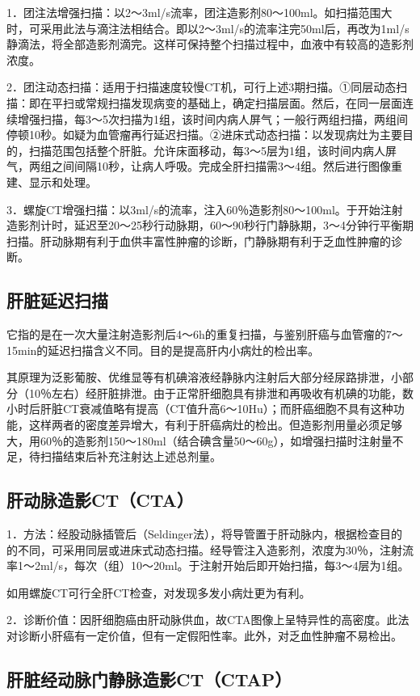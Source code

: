 1．团注法增强扫描：以2～3ml/s流率，团注造影剂80～100ml。如扫描范围大时，可采用此法与滴注法相结合。即以2～3ml/s的流率注完50ml后，再改为1ml/s静滴法，将全部造影剂滴完。这样可保持整个扫描过程中，血液中有较高的造影剂浓度。

2．团注动态扫描：适用于扫描速度较慢CT机，可行上述3期扫描。①同层动态扫描：即在平扫或常规扫描发现病变的基础上，确定扫描层面。然后，在同一层面连续增强扫描，每3～5次扫描为1组，该时间内病人屏气；一般行两组扫描，两组间停顿10秒。如疑为血管瘤再行延迟扫描。②进床式动态扫描：以发现病灶为主要目的，扫描范围包括整个肝脏。允许床面移动，每3～5层为1组，该时间内病人屏气，两组之间间隔10秒，让病人呼吸。完成全肝扫描需3～4组。然后进行图像重建、显示和处理。

3．螺旋CT增强扫描：以3ml/s的流率，注入60％造影剂80～100ml。于开始注射造影剂计时，延迟至20～25秒行动脉期，60～90秒行门静脉期，3～4分钟行平衡期扫描。肝动脉期有利于血供丰富性肿瘤的诊断，门静脉期有利于乏血性肿瘤的诊断。

\subsection{肝脏延迟扫描}

它指的是在一次大量注射造影剂后4～6h的重复扫描，与鉴别肝癌与血管瘤的7～15min的延迟扫描含义不同。目的是提高肝内小病灶的检出率。

其原理为泛影葡胺、优维显等有机碘溶液经静脉内注射后大部分经尿路排泄，小部分（10％左右）经肝脏排泄。由于正常肝细胞具有排泄和再吸收有机碘的功能，数小时后肝脏CT衰减值略有提高（CT值升高6～10Hu）；而肝癌细胞不具有这种功能，这样两者的密度差异增大，有利于肝癌病灶的检出。但造影剂用量必须足够大，用60％的造影剂150～180ml（结合碘含量50～60g），如增强扫描时注射量不足，待扫描结束后补充注射达上述总剂量。

\subsection{肝动脉造影CT（CTA）}

1．方法：经股动脉插管后（Seldinger法），将导管置于肝动脉内，根据检查目的的不同，可采用同层或进床式动态扫描。经导管注入造影剂，浓度为30％，注射流率1～2ml/s，每次（组）10～20ml。于注射开始后即开始扫描，每3～4层为1组。

如用螺旋CT可行全肝CT检查，对发现多发小病灶更为有利。

2．诊断价值：因肝细胞癌由肝动脉供血，故CTA图像上呈特异性的高密度。此法对诊断小肝癌有一定价值，但有一定假阳性率。此外，对乏血性肿瘤不易检出。

\subsection{肝脏经动脉门静脉造影CT（CTAP）}

